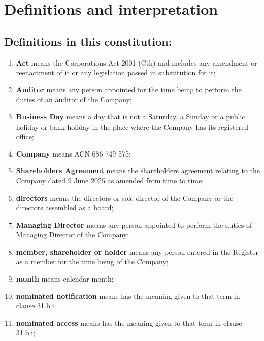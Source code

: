 \section{Definitions and interpretation}

\subsection{Definitions in this constitution:}

\begin{enumerate}[label=(\roman*)]
    \item \textbf{Act} means the Corporations Act 2001 (Cth) and includes any amendment or reenactment of it or any legislation passed in substitution for it;
    
    \item \textbf{Auditor} means any person appointed for the time being to perform the duties of an auditor of the Company;
    
    \item \textbf{Business Day} means a day that is not a Saturday, a Sunday or a public holiday or bank holiday in the place where the Company has its registered office;
    
    \item \textbf{Company} means ACN 686 749 575;
    
    \item \textbf{Shareholders Agreement} means the shareholders agreement relating to the Company dated 9 June 2025 as amended from time to time;
    
    \item \textbf{directors} means the directors or sole director of the Company or the directors assembled as a board;
    
    \item \textbf{Managing Director} means any person appointed to perform the duties of Managing Director of the Company;
    
    \item \textbf{member, shareholder or holder} means any person entered in the Register as a member for the time being of the Company;
    
    \item \textbf{month} means calendar month;
    
    \item \textbf{nominated notification} means has the meaning given to that term in clause 31.b.i;
    
    \item \textbf{nominated access} means has the meaning given to that term in clause 31.b.i;
    

\end{enumerate}

